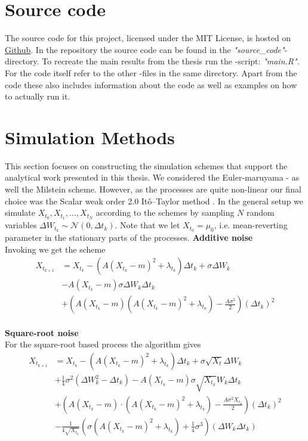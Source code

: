 \section{Source code}
The source code for this project, licensed under the MIT License, is hosted on \href{https://github.com/Gantzhorn/Thesis}{Github}. In the repository the source code can be found in the \textit{"source\_code"}-directory. To recreate the main results from the thesis run the -script: \textit{"main.R"}. For the code itself refer to the other -files in the same directory. Apart from the code these also includes information about the code as well as examples on how to actually run it. 
\section{Simulation Methods}\label{appendix:simMethods}
This section focuses on constructing the simulation schemes that support the analytical work presented in this thesis. We considered the Euler-maruyama - as well the Milstein scheme. However, as the processes are quite non-linear our final choice was the Scalar weak order 2.0 Itô–Taylor method \cite[algorithm 8.5]{Srkk2019}. In the general setup we simulate $X_{t_0},X_{t_1},\dots, X_{t_N}$ according to the schemes by sampling $N$ random variables $\Delta W_{t_k}\sim\mathcal{N}\left(0, \Delta t_k\right)$. Note that we let $X_{t_0} = \mu_0$, i.e. mean-reverting parameter in the stationary parts of the processes.
\noindent \textbf{Additive noise}\\
Invoking \cite[algorithm 8.5]{Srkk2019} we get the scheme
\begin{align}
    X_{t_{k + 1}} &= X_{t_k} - \left(A(X_{t_k} - m)^2 + \lambda_{t_k}\right) \Delta t_k + \sigma \Delta W_{k} \nonumber \\&-  A \left(X_{t_k} - m\right)\sigma \Delta W_k \Delta t_k\nonumber \\
    & + \left(A\left(X_{t_k} - m\right)\left(A\left(X_{t_k} - m\right)^2 + \lambda_{t_k}\right) - \frac{A \sigma^2}{2}\right)\left(\Delta t_k\right)^2 \label{eq:OUSim}
\end{align}
\\
\textbf{Square-root noise}\\
For the square-root based process the algorithm gives 
\begin{align}
    X_{t_{k + 1}} &= X_{t_k} - \left(A(X_{t_k} - m)^2 + \lambda_{t_k}\right) \Delta t_k + \sigma \sqrt{X_t} \Delta W_{k}\nonumber\\ &+ \frac{1}{4}\sigma^2 \left(\Delta W_k^2 - \Delta t_k\right)     - A\left(X_{t_k} - m\right)\sigma \sqrt{X_{t_k}} W_k \Delta t_k
    \nonumber\\
     &+ \left(A\left(X_{t_k} - m\right)\cdot \left(A\left(X_{t_k} - m\right)^2 + \lambda_{t_k}\right) - \frac{A\sigma^2 X_{t_k}}{2}\right)(\Delta t_k)^2 \nonumber\\
    &- \frac{1}{4\sqrt{X_{t_k}}}\left(\sigma\left(A\left(X_{t_k} - m\right)^2 + \lambda_{t_k}\right) + \frac{1}{4}\sigma^3\right) \left(\Delta W_k \Delta t_k\right)
\end{align}

